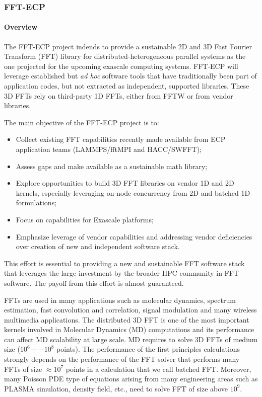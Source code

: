\subsubsection{ FFT-ECP}\label{subsubsect:fftecp}


\paragraph{Overview}

The FFT-ECP project indends to provide a sustainable 2D and 3D Fast Fourier 
Transform (FFT) library 
for distributed-heterogeneous parallel systems as the one projected for 
the upcoming exascale computing systems. FFT-ECP will leverage
established but {\it ad hoc} 
software tools that have traditionally been part of application 
codes, but not extracted as independent, supported libraries. 
These 3D FFTs rely on third-party 1D FFTs, either from FFTW or 
from vendor libraries.

The main objective of the FFT-ECP project is to:
\begin{itemize}
\item Collect existing FFT capabilities recently made available from ECP 
      application teams (LAMMPS/fftMPI and HACC/SWFFT);
\item Assess gaps and make available as a sustainable math library;
\item Explore opportunities to build 3D FFT libraries on vendor 1D and 
      2D kernels, especially leveraging on-node concurrency from 2D and 
      batched 1D formulations;
\item Focus on capabilities for Exascale platforms;
\item Emphasize leverage of vendor capabilities and addressing vendor 
      deficiencies over creation of new and independent software stack.
\end{itemize}

This effort is 
essential to providing a new and sustainable FFT software stack that 
leverages the large investment by the broader HPC community in FFT 
software. The payoff from this effort is almost guaranteed. 

FFTs are used in many applications such as molecular dynamics, 
spectrum estimation, fast convolution and correlation, signal 
modulation and many wireless multimedia applications. The 
distributed 3D FFT is one of the most important kernels involved 
in Molecular Dynamics (MD) computations and its performance can 
affect MD scalability at large scale. MD requires to solve 3D FFTs 
of medium size ($10^6--10^8$ points). The performance of the first 
principles calculations strongly depends on the performance of the 
FFT solver that performs many FFTs of size $\approx 10^7$ points in 
a calculation that we call batched FFT. Moreover, many Poisson PDE 
type of equations arising from many engineering areas such as PLASMA 
simulation, density field, etc., need to solve FFT of size above $10^9$. 

